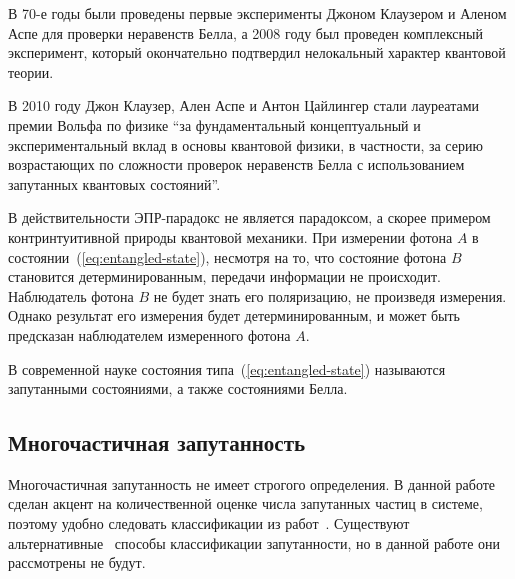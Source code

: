 В 70-е годы были проведены первые эксперименты\cite{Alain1976} Джоном Клаузером и Аленом Аспе для проверки неравенств Белла,
а 2008 году был проведен комплексный эксперимент\cite{Scheidl2010},
который окончательно подтвердил нелокальный характер квантовой теории.

В 2010 году Джон Клаузер, Ален Аспе и Антон Цайлингер стали лауреатами премии Вольфа по физике ``за фундаментальный концептуальный и экспериментальный вклад в основы квантовой физики, в частности, за серию возрастающих по сложности проверок неравенств Белла с использованием запутанных квантовых состояний''.

В действительности  ЭПР-парадокс не является парадоксом,
а скорее примером контринтуитивной природы квантовой механики.
При измерении фотона $A$ в состоянии~(\ref{eq:entangled-state}),
несмотря на то, что состояние фотона $B$ становится детерминированным,
передачи информации не происходит.
Наблюдатель фотона $B$ не будет знать его поляризацию,
не произведя измерения.
Однако результат его измерения будет детерминированным,
и может быть предсказан наблюдателем измеренного фотона $A$.

В современной науке состояния типа~(\ref{eq:entangled-state}) называются запутанными состояниями, а также состояниями Белла.


\subsection{Многочастичная запутанность}


Многочастичная запутанность не имеет строгого определения.
В данной работе сделан акцент на количественной оценке числа запутанных частиц в системе,
поэтому удобно следовать классификации из работ~\cite{Seevinck2001, Toth2005, Bancal2009, Chen2005, Guhne2005, Guhne2006}.
Существуют альтернативные~\cite{Dur1999, Dur2000} способы классификации запутанности,
но в данной работе они рассмотрены не будут.

